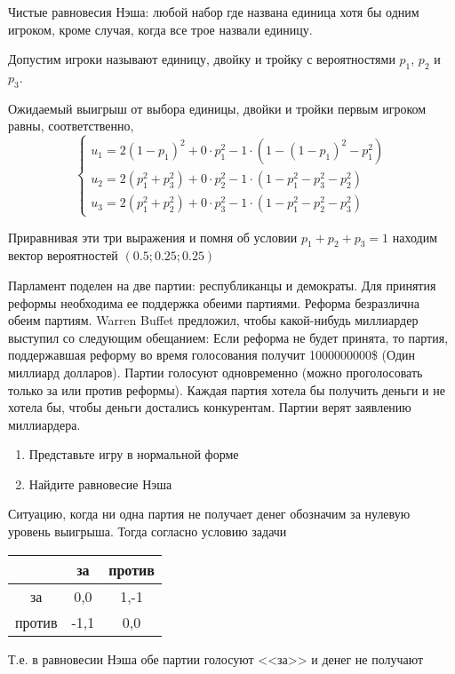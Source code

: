 \begin{solution}
Чистые равновесия Нэша: любой набор где названа единица хотя бы одним игроком, кроме случая, когда все трое назвали единицу.

Допустим игроки называют единицу, двойку и тройку с вероятностями $p_1$, $p_2$ и $p_3$.

Ожидаемый выигрыш от выбора единицы, двойки и тройки первым игроком равны, соответственно,
\[
\begin{cases}
u_1= 2(1-p_1)^2+0\cdot p_1^2-1\cdot (1-(1-p_1)^2-p_1^2) \\
u_2 = 2(p_1^2+p_3^2)+0\cdot p_2^2-1\cdot (1-p_1^2-p_3^2-p_2^2) \\
u_3= 2(p_1^2+p_2^2)+0\cdot p_3^2-1\cdot(1-p_1^2-p_2^2-p_3^2)
\end{cases}
\]

Приравнивая эти три выражения и помня об условии $p_1+p_2+p_3=1$ находим вектор вероятностей  $(0.5;0.25;0.25)$ 
\end{solution}

\begin{problem}
Парламент поделен на две партии: республиканцы и демократы. Для принятия реформы необходима ее поддержка обеими партиями. Реформа безразлична обеим партиям. Warren Buffet предложил, чтобы какой-нибудь миллиардер выступил со следующим обещанием: Если реформа не будет принята, то партия, поддержавшая реформу во время голосования получит 1000000000\$ (Один миллиард долларов). Партии голосуют одновременно (можно проголосовать только за или против реформы). Каждая партия хотела бы получить деньги и не хотела бы, чтобы деньги достались конкурентам. Партии верят заявлению миллиардера.
\begin{enumerate}
\item  Представьте игру в нормальной форме
\item Найдите равновесие Нэша
\end{enumerate}
\end{problem}

\begin{solution}
Ситуацию, когда ни одна партия не получает денег обозначим за нулевую уровень выигрыша. Тогда согласно условию задачи

\begin{tabular}{c|cc}
 & за & против \\ 
\hline 
за & 0,0 & 1,-1 \\ 
против & -1,1 & 0,0 
\end{tabular} 

Т.е. в равновесии Нэша обе партии голосуют <<за>> и денег не получают
\end{solution}

